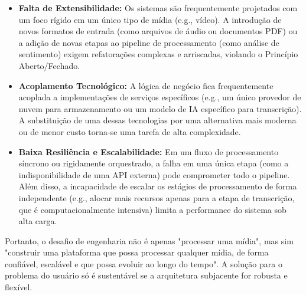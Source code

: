 \begin{itemize}
    \item \textbf{Falta de Extensibilidade:} Os sistemas são frequentemente projetados com um foco rígido em um único tipo de mídia (e.g., vídeo). A introdução de novos formatos de entrada (como arquivos de áudio ou documentos PDF) ou a adição de novas etapas ao pipeline de processamento (como análise de sentimento) exigem refatorações complexas e arriscadas, violando o Princípio Aberto/Fechado.
    
    \item \textbf{Acoplamento Tecnológico:} A lógica de negócio fica frequentemente acoplada a implementações de serviços específicos (e.g., um único provedor de nuvem para armazenamento ou um modelo de IA específico para transcrição). A substituição de uma dessas tecnologias por uma alternativa mais moderna ou de menor custo torna-se uma tarefa de alta complexidade.
    
    \item \textbf{Baixa Resiliência e Escalabilidade:} Em um fluxo de processamento síncrono ou rigidamente orquestrado, a falha em uma única etapa (como a indisponibilidade de uma API externa) pode comprometer todo o pipeline. Além disso, a incapacidade de escalar os estágios de processamento de forma independente (e.g., alocar mais recursos apenas para a etapa de transcrição, que é computacionalmente intensiva) limita a performance do sistema sob alta carga.
\end{itemize}

Portanto, o desafio de engenharia não é apenas "processar uma mídia", mas sim "construir uma plataforma que possa processar qualquer mídia, de forma confiável, escalável e que possa evoluir ao longo do tempo". A solução para o problema do usuário só é sustentável se a arquitetura subjacente for robusta e flexível.
